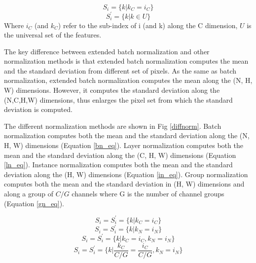 \documentclass[runningheads]{llncs}
\begin{document}
\begin{equation} \label{ebn_mean_eq}
S_{i}=\{k|k_{C}=i_{C}\} 
\end{equation}
\begin{equation} \label{ebn_std_eq}
S_{i}^{'}=\{k|k \in U\} 
\end{equation}
Where $i_{C}$ (and $k_{C}$) refer to the sub-index of i (and k) along the C dimension, $U$ is the universal set of the features.

The key difference between extended batch normalization and other normalization methods is that extended batch normalization computes the mean and the standard deviation from different set of pixels. As the same as batch normalization, extended batch normalization computes the mean along the (N, H, W) dimensions. However, it computes the standard deviation along the (N,C,H,W) dimensions, thus enlarges the pixel set from which the standard deviation is computed.

The different normalization methods are shown in Fig \ref{diffnorm}. Batch normalization computes both the mean and the standard deviation along the (N, H, W) dimensions (Equation \ref{bn_eq}). Layer normalization computes both the mean and the standard deviation along the (C, H, W) dimensions (Equation \ref{ln_eq}).  Instance normalization computes both the mean and the standard deviation along the (H, W) dimensions (Equation \ref{in_eq}). Group normalization computes both the mean and the standard deviation in (H, W) dimensions and along a group of $C/G$ channels where G is the number of channel groups (Equation \ref{gn_eq}). 

\begin{equation} \label{bn_eq}
S_{i}=S_{i}^{'}=\{k|k_{C}=i_{C}\} 
\end{equation}
\begin{equation} \label{ln_eq}
S_{i}=S_{i}^{'}=\{k|k_{N}=i_{N}\} 
\end{equation}
\begin{equation} \label{in_eq}
S_{i}=S_{i}^{'}=\{k|k_{C}=i_{C},k_{N}=i_{N}\} 
\end{equation}
\begin{equation} \label{gn_eq}
S_{i}=S_{i}^{'}=\{k|\frac{k_{C}}{C/G}=\frac{i_{C}}{C/G},k_{N}=i_{N}\} 
\end{equation}
\end{document}
